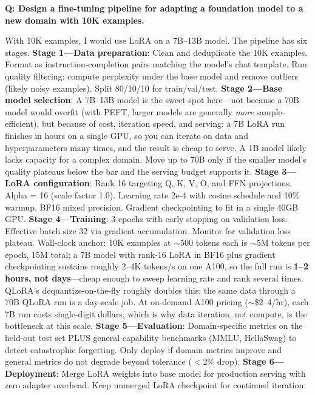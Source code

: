 \begin{interviewq}
\textbf{Q: Design a fine-tuning pipeline for adapting a foundation model to a new domain with 10K examples.}

 \quad {} \quad \badgefreq{\freqmed}

\stronganswer With 10K examples, I would use LoRA on a 7B--13B model. The pipeline has six stages. \textbf{Stage 1---Data preparation}: Clean and deduplicate the 10K examples. Format as instruction-completion pairs matching the model's chat template. Run quality filtering: compute perplexity under the base model and remove outliers (likely noisy examples). Split 80/10/10 for train/val/test. \textbf{Stage 2---Base model selection}: A 7B--13B model is the sweet spot here---not because a 70B model would overfit (with PEFT, larger models are generally \textit{more} sample-efficient), but because of cost, iteration speed, and serving: a 7B LoRA run finishes in hours on a single GPU, so you can iterate on data and hyperparameters many times, and the result is cheap to serve. A 1B model likely lacks capacity for a complex domain. Move up to 70B only if the smaller model's quality plateaus below the bar and the serving budget supports it. \textbf{Stage 3---LoRA configuration}: Rank 16 targeting Q, K, V, O, and FFN projections. Alpha = 16 (scale factor 1.0). Learning rate 2e-4 with cosine schedule and 10\% warmup. BF16 mixed precision. Gradient checkpointing to fit in a single 40GB GPU. \textbf{Stage 4---Training}: 3 epochs with early stopping on validation loss. Effective batch size 32 via gradient accumulation. Monitor for validation loss plateau. Wall-clock anchor: 10K examples at $\sim$500 tokens each is $\sim$5M tokens per epoch, 15M total; a 7B model with rank-16 LoRA in BF16 plus gradient checkpointing sustains roughly 2--4K tokens/s on one A100, so the full run is \textbf{1--2 hours, not days}---cheap enough to sweep learning rate and rank several times. QLoRA's dequantize-on-the-fly roughly doubles this; the same data through a 70B QLoRA run is a day-scale job. At on-demand A100 pricing ($\sim$\$2--4/hr), each 7B run costs single-digit dollars, which is why data iteration, not compute, is the bottleneck at this scale. \textbf{Stage 5---Evaluation}: Domain-specific metrics on the held-out test set PLUS general capability benchmarks (MMLU, HellaSwag) to detect catastrophic forgetting. Only deploy if domain metrics improve and general metrics do not degrade beyond tolerance ($<$2\% drop). \textbf{Stage 6---Deployment}: Merge LoRA weights into base model for production serving with zero adapter overhead. Keep unmerged LoRA checkpoint for continued iteration.


\end{interviewq}
